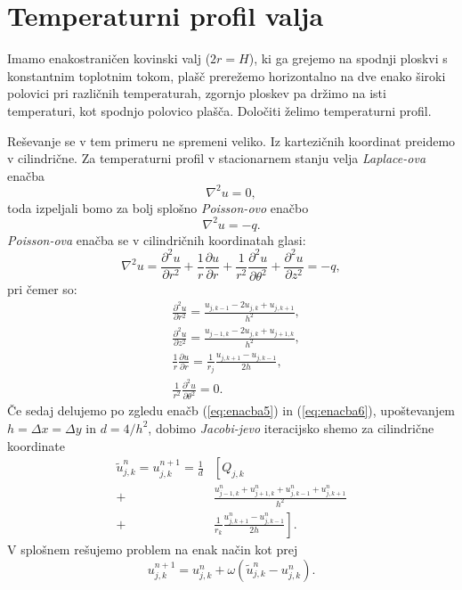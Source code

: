 \documentclass[12pt,a4paper]{article}
\begin{document}
\section*{Temperaturni profil valja}

Imamo enakostraničen kovinski valj ($2r=H$), ki ga grejemo na spodnji ploskvi s konstantnim toplotnim tokom, plašč prerežemo horizontalno na dve enako široki polovici pri različnih temperaturah, zgornjo ploskev pa držimo na isti temperaturi, kot spodnjo polovico plašča. Določiti želimo temperaturni profil.

Reševanje se v tem primeru ne spremeni veliko. Iz kartezičnih koordinat preidemo v cilindrične. Za temperaturni profil v stacionarnem stanju velja \textit{Laplace-ova} enačba
\begin{equation*}
\nabla ^{2} u=0,
\end{equation*}
toda izpeljali bomo za bolj splošno \textit{Poisson-ovo} enačbo
\begin{equation*}
\nabla ^{2} u=-q.
\end{equation*}
\textit{Poisson-ova} enačba se v cilindričnih koordinatah glasi:
\begin{equation}
\nabla ^{2} u=  \frac{\partial ^{2} u}{ \partial r^{2}} + \frac{1}{r} \frac{\partial u}{\partial r} + 
\frac{1}{r^{2}}\frac{\partial ^{2} u}{\partial \theta ^{2}} + \frac{\partial ^{2} u}{\partial z^{2}}=-q,
\end{equation} 
pri čemer so:
\begin{align}
& \frac{\partial ^{2} u}{\partial r^{2}} =\frac{u_{j,k-1} - 2 u_{j,k} + u_{j,k+1}}{h^{2}}, \\
& \frac{\partial ^{2} u}{ \partial z^{2}} =  \frac{u_{j-1,k} - 2 u_{j,k} + u_{j+1,k}}{h^{2}}, \\
& \frac{1}{r} \frac{\partial u}{\partial r} =  \frac{1}{r_j} \frac{u_{j,k+1} - u_{j,k-1}}{2h}, \\
& \frac{1}{r^{2}}\frac{\partial ^{2} u}{\partial \theta ^{2}}= 0.
\end{align}
Če sedaj delujemo po zgledu enačb (\ref{eq:enacba5}) in (\ref{eq:enacba6}), upoštevanjem $h= \Delta x = \Delta y$ in $d=4/h^{2}$, dobimo \textit{Jacobi-jevo} iteracijsko shemo za cilindrične koordinate
\begin{align} \label{eq:enacba17}
\tilde{u}^{n}_{j,k}=u^{n+1}_{j,k}= \frac{1}{d} &\left[ Q_{j,k} \right. \nonumber \\
+& \frac{u_{j-1,k}^{n} + u_{j+1,k}^{n} + u_{j,k-1}^{n}  + u_{j,k+1}^{n} }{h^{2}} \nonumber \\
+ &\left.  \frac{1}{r_k} \frac{u_{j,k+1}^{n} - u_{j,k-1}^{n}}{2h} \right].
\end{align}
V splošnem rešujemo problem na enak način kot prej
\begin{equation*}
u_{j,k} ^{n+1} = u_{j,k} ^{n} + \omega \left( \tilde{u}_{j,k} ^{n} - u_{j,k} ^{n}  \right).
\end{equation*}
\end{document}
